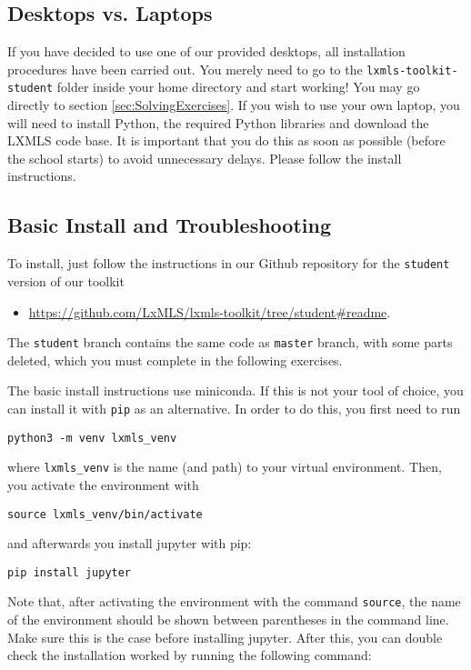 \subsection{Desktops vs. Laptops}

If you have decided to use one of our provided desktops, all installation procedures have been carried out. You merely need to go to the \verb+lxmls-toolkit-student+ folder inside your home directory and start working! You may go directly to section \ref{sec:SolvingExercises}. If you wish to use your own laptop, you will need to install Python, the required Python libraries and download the LXMLS code base. It is important that you do this as soon as possible (before the school starts) to avoid unnecessary delays. Please follow the install instructions. 

\subsection{Basic Install and Troubleshooting}

To install, just follow the instructions in our Github repository for the \verb+student+ version of our toolkit 

\begin{itemize}
\item \url{https://github.com/LxMLS/lxmls-toolkit/tree/student#readme}. 
\end{itemize}

The \verb+student+ branch contains the same code as \verb+master+ branch, with some parts deleted, which you must complete in the following exercises. 

The basic install instructions use miniconda. If this is not your tool of choice, you can install it with \texttt{pip} as an alternative. In order to do this, you first need to run

 \texttt{python3 -m venv lxmls\_venv}

where \texttt{lxmls\_venv} is the name (and path) to your virtual environment. Then, you activate the environment with 

\texttt{source lxmls\_venv/bin/activate} 

and afterwards you install jupyter with pip:

\texttt{pip install jupyter}

Note that, after activating the environment with the command \texttt{source}, the name of the environment should be shown between parentheses in the command line. Make sure this is the case before installing jupyter. After this, you can double check the installation worked by running the following command:

